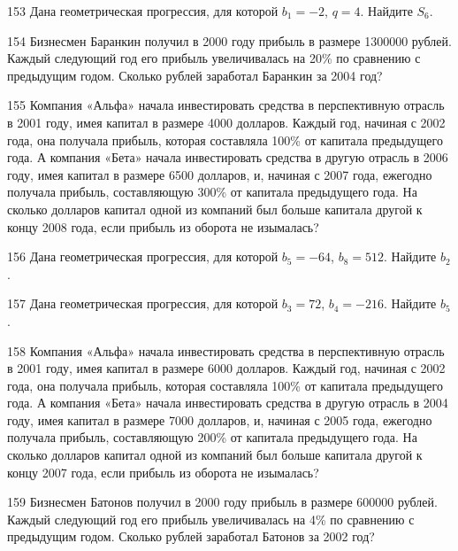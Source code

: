 \documentclass[4apaper]{article}
\begin{document}
\begin{taskBN}{153}
Дана геометрическая прогрессия, для которой $b_1 = -2$, $q=4$. Найдите $S_{6}$.
\end{taskBN}

\begin{taskBN}{154}
Бизнесмен Баранкин получил в 2000 году прибыль в размере 1300000 рублей. Каждый следующий год его прибыль увеличивалась на 20\% по сравнению с предыдущим годом. Сколько рублей заработал Баранкин за 2004 год?
\end{taskBN}

\begin{taskBN}{155}
Компания «Альфа» начала инвестировать средства в перспективную отрасль в 2001 году, имея капитал в размере 4000 долларов. Каждый год, начиная с 2002 года, она получала прибыль, которая составляла 100\% от капитала предыдущего года. А компания «Бета» начала инвестировать средства в другую отрасль в 2006 году, имея капитал в размере 6500 долларов, и, начиная с 2007 года, ежегодно получала прибыль, составляющую 300\% от капитала предыдущего года. На сколько долларов капитал одной из компаний был больше капитала другой к концу 2008 года, если прибыль из оборота не изымалась?
\end{taskBN}

\begin{taskBN}{156}
Дана геометрическая прогрессия, для которой $b_{5} = -64$, $b_{8}=512$. Найдите $b_{2}$.
\end{taskBN}

\begin{taskBN}{157}
Дана геометрическая прогрессия, для которой $b_{3} = 72$, $b_{4}=-216$. Найдите $b_{5}$.
\end{taskBN}

\begin{taskBN}{158}
Компания «Альфа» начала инвестировать средства в перспективную отрасль в 2001 году, имея капитал в размере 6000 долларов. Каждый год, начиная с 2002 года, она получала прибыль, которая составляла 100\% от капитала предыдущего года. А компания «Бета» начала инвестировать средства в другую отрасль в 2004 году, имея капитал в размере 7000 долларов, и, начиная с 2005 года, ежегодно получала прибыль, составляющую 200\% от капитала предыдущего года. На сколько долларов капитал одной из компаний был больше капитала другой к концу 2007 года, если прибыль из оборота не изымалась?
\end{taskBN}

\begin{taskBN}{159}
Бизнесмен Батонов получил в 2000 году прибыль в размере 600000 рублей. Каждый следующий год его прибыль увеличивалась на 4\% по сравнению с предыдущим годом. Сколько рублей заработал Батонов за 2002 год?
\end{taskBN}
\end{document}
